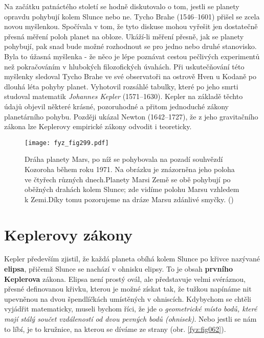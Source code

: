 {    Na začátku patnáctého století se hodně diskutovalo o tom, jestli se planety opravdu pohybují 
    kolem Slunce nebo ne. Tycho Brahe (1546–1601) přišel se zcela novou myšlenkou. Spočívala v tom, 
    že tyto diskuse mohou vyřešit jen dostatečně přesná měření poloh planet na obloze. Ukáží-li 
    měření přesně, jak se planety pohybují, pak snad bude možné rozhodnout se pro jedno nebo druhé 
    stanovisko. Byla to úžasná myšlenka - že něco je lépe poznávat cestou pečlivých experimentů než 
    pokračováním v hlubokých filozofických úvahách. Při uskutečňování této myšlenky sledoval Tycho 
    Brahe ve své observatoři na ostrově Hven u Kodaně po dlouhá léta pohyby planet. Vyhotovil 
    rozsáhlé tabulky, které po jeho smrti studoval matematik \emph{Johannes Kepler} (1571–1630). 
    Kepler na základě těchto údajů objevil některé krásné, pozoruhodné a přitom jednoduché zákony 
    planetárního pohybu. Později ukázal Newton (1642–1727), že z jeho gravitačního zákona lze 
    Keplerovy empirické zákony odvodit i teoreticky.

    \begin{figure}[ht!]  %
      \centering
      \texttt{[image: fyz\_fig299.pdf]}
      \caption{Dráha planety Mars, po níž se pohybovala na pozadí souhvězdí Kozoroha během roku 
               1971. Na obrázku je znázorněna jeho poloha ve čtyřech různých dnech.Planety Marsi 
               Země se obě pohybují po oběžných drahách kolem Slunce; zde vidíme polohu Marsu 
               vzhledem k Zemi.Díky tomu pozorujeme na dráze Marsu zdánlivé smyčky. 
               (\cite[s.~366]{Halliday2001})}
      \label{fyz:fig299}
    \end{figure}
    
  \section{Keplerovy zákony}
    Kepler především zjistil, že každá planeta obíhá kolem Slunce po křivce nazývané 
    \textbf{elipsa}, přičemž Slunce se nachází v ohnisku elipsy. To je obsah \textbf{prvního 
    Keplerova} zákona. Elipsa není prostý ovál, ale představuje velmi svéráznou, přesné definovanou 
    křivku, kterou je možné získat tak, že tužkou napínáme nit upevněnou na dvou špendlíčkách 
    umístěných v ohniscích. Kdybychom se chtěli vyjádřit matematicky, museli bychom říci, že jde o 
    \emph{geometrické místo bodů, které mají stálý součet vzdáleností od dvou pevných bodů 
    (ohnisek)}. Nebo jestli se nám to líbí, je to kružnice, na kterou se díváme ze strany (obr. 
    \ref{fyz:fig062}).
    
}
